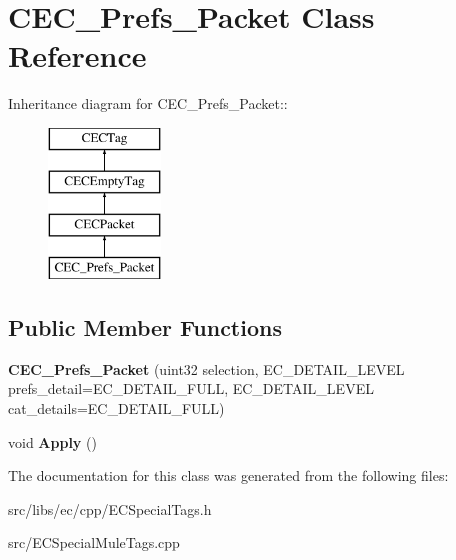 \section{CEC\_\-Prefs\_\-Packet Class Reference}
\label{classCEC__Prefs__Packet}
Inheritance diagram for CEC\_\-Prefs\_\-Packet::\begin{figure}[H]
\begin{center}
\leavevmode
\includegraphics[height=4cm]{classCEC__Prefs__Packet}
\end{center}
\end{figure}
\subsection*{Public Member Functions}
\begin{DoxyCompactItemize}
\item 
{\bfseries CEC\_\-Prefs\_\-Packet} (uint32 selection, EC\_\-DETAIL\_\-LEVEL prefs\_\-detail=EC\_\-DETAIL\_\-FULL, EC\_\-DETAIL\_\-LEVEL cat\_\-details=EC\_\-DETAIL\_\-FULL)\label{classCEC__Prefs__Packet_a792195de1063f2a52c04c99c7b1d28e0}

\item 
void {\bfseries Apply} ()\label{classCEC__Prefs__Packet_ac00c2b491aac04d88b9055ef48f3ec69}

\end{DoxyCompactItemize}


The documentation for this class was generated from the following files:\begin{DoxyCompactItemize}
\item 
src/libs/ec/cpp/ECSpecialTags.h\item 
src/ECSpecialMuleTags.cpp\end{DoxyCompactItemize}
